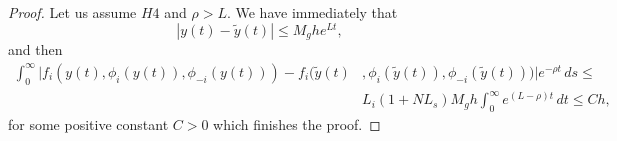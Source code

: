 \documentclass[10pt,a4paper]{amsart}
\begin{document}
\begin{proof}
Let us assume $H4$ and {$\rho>L$}.
We have immediately that{
$$
|y(t)-\tilde y(t)|\le M_g h e^{Lt},
$$
}
and  then
\begin{equation*}
\begin{split}
\int_0^\infty |f_i(y(t),\phi_i(y(t)),\phi_{-i}(y(t)))-f_i(\tilde{y}(t)&,{\phi}_i(\tilde{y}(t)),\phi_{-i}(\tilde{y}(t)))|e^{-\rho t}\, ds\le \\
&L_i(1+NL_s)M_gh\int_0^\infty e^{(L-\rho)t}\, dt \le Ch,
\end{split}
\end{equation*}
for some positive constant $C>0$ which finishes the proof.
\end{proof}
\end{document}
